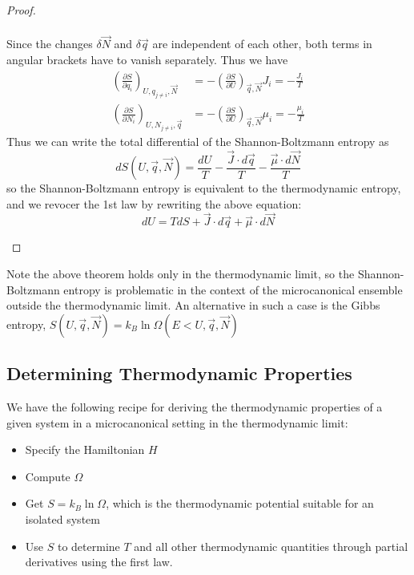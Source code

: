 \documentclass[12pt, a4paper, oneside, openright, titlepage]{book}
\begin{document}
\begin{proof}
\begin{itemize}
\begin{align*}
        \end{align*}
            Since the changes $\delta \vec{N}$ and $\delta \vec{q}$ are independent of each other, both terms in angular brackets have to vanish separately. Thus we have \begin{align*}
                \left(\frac{\partial S}{\partial q_i}\right)_{U,q_{j\neq i},\vec{N}} &= -\left(\frac{\partial S}{\partial U}\right)_{\vec{q},\vec{N}}J_i = -\frac{J_i}{T} \\
                \left(\frac{\partial S}{\partial N_i}\right)_{U,N_{j\neq i},\vec{q}} &= -\left(\frac{\partial S}{\partial U}\right)_{\vec{q},\vec{N}}\mu_i = -\frac{\mu_i}{T}
            \end{align*}
            Thus we can write the total differential of the Shannon-Boltzmann entropy as \begin{equation*}
                dS(U,\vec{q},\vec{N}) = \frac{dU}{T} - \frac{\vec{J}\cdot d\vec{q}}{T} - \frac{\vec{\mu}\cdot d\vec{N}}{T}
            \end{equation*}
            so the Shannon-Boltzmann entropy is equivalent to the thermodynamic entropy, and we revocer the 1st law by rewriting the above equation: \begin{equation*}
                dU = TdS + \vec{J}\cdot d\vec{q}+\vec{\mu}\cdot d\vec{N}
            \end{equation*}
    \end{itemize}
\end{proof}

Note the above theorem holds only in the thermodynamic limit, so the Shannon-Boltzmann entropy is problematic in the context of the microcanonical ensemble outside the thermodynamic limit. An alternative in such a case is the Gibbs entropy, $S(U,\vec{q},\vec{N}) = k_B\ln\Omega(E< U,\vec{q},\vec{N})$

\subsection{Determining Thermodynamic Properties}

We have the following recipe for deriving the thermodynamic properties of a given system in a microcanonical setting in the thermodynamic limit: \begin{itemize}
    \item Specify the Hamiltonian $H$
    \item Compute $\Omega$
    \item Get $S = k_B\ln\Omega$, which is the thermodynamic potential suitable for an isolated system
    \item Use $S$ to determine $T$ and all other thermodynamic quantities through partial derivatives using the first law.
\end{itemize}
\end{document}
